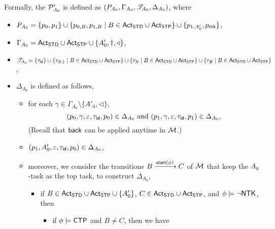 Formally, the {\WOTrPDS} ${\mathcal{P} }'_{A_0}$ is defined as $(P_{A_0}, \Gamma_{A_0}, {\mathscr{T} }_{A_0}, \Delta_{A_0})$, where 
\begin{itemize}
\item $P_{A_0} = \{p_0, p_1\}\cup\{ p_{0, B}, p_{1, B} \mid B \in  {\sf Act}_{\sf STD} \cup {\sf Act}_{\sf STP}\} \cup \{p_{1, A'_0}, p_{\sf ctk}\}$,
\item $\Gamma_{A_0} = {\sf Act}_{\sf STD} \cup {\sf Act}_{\sf STP} \cup \{A'_0, \dag, \triangleleft\}$, 
\item ${\mathscr{T} }_{A_0} = \{\tau_{\mathsf{id}} \}\cup \{\tau_{B, \dag} \mid B \in {\sf Act}_{\sf STD} \cup {\sf Act}_{\sf STP} \} \cup \{\tau_{B} \mid B \in {\sf Act}_{\sf STD} \cup {\sf Act}_{\sf STP}\}  \cup \{\tau_{\not B} \mid B \in {\sf Act}_{\sf STD} \cup {\sf Act}_{\sf STP}\}$, 
\item $\Delta_{A_0}$ is defined as follows,
        \begin{itemize}
            \item for each $\gamma \in \Gamma_{A_0} \setminus \{A'_0, \triangleleft\}$, 
            $$(p_0, \gamma, \varepsilon, \tau_{\mathsf{id}}, p_0) \in \Delta_{A_0} \mbox{ and } (p_1, \gamma, \varepsilon, \tau_{\mathsf{id}}, p_1) \in \Delta_{A_0},$$ 
            (Recall that ${\mathsf{back} }$ can be applied anytime in ${\mathcal{M} }$.)
            \item $(p_1, A'_0, \varepsilon, \tau_{\mathsf{id}}, p_0) \in \Delta_{A_0}$,
	    \item moreover, we consider the transitions $B \xrightarrow{{\mathsf{start} }(\phi)} C$ of ${\mathcal{M} }$ that keep the $A_0$-task as the top task, to construct $\Delta_{A_0}$, 
			\begin{itemize}
				\item if $B \in {\sf Act}_{\sf STD} \cup {\sf Act}_{\sf STP} \cup \{A'_0\}$, $C \in {\sf Act}_{\sf STD} \cup {\sf Act}_{\sf STP}$, and $\phi \models \neg {\sf NTK}$, then 
				\begin{itemize}
				\item if $\phi \models {\sf CTP}$ and $B \neq C$, then we have 

\end{itemize}
\end{itemize}
\end{itemize}
\end{itemize}
